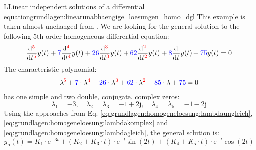 \begin{frame}
{    \begin{expl}{LLinear independent solutions of a differential equation}{grundlagen:linearunabhaengige_loesungen_homo_dgl}
        This example is taken almost unchanged from \cite[p. 241]{albach}.
        We are looking for the general solution to the following 5th order homogeneous differential equation:
        \begin{equation*}
            \dt[\ecr{5}] y(t) + \ecb{7} \dt[\ecr{4}] y(t) + \ecb{26} \dt[\ecr{3}] y(t) + \ecb{62} \dt[\ecr{2}] y(t) + \ecb{8} \dt y(t) + \ecb{75} y(t) = 0
        \end{equation*}
        The characteristic polynomial:
        \begin{equation*}
            \lambda^{\ecr{5}} + \ecb{7} \cdot \lambda^{\ecr{4}} + \ecb{26} \cdot \lambda^{\ecr{3}} + \ecb{62} \cdot \lambda^{\ecr{2}} + \ecb{85} \cdot \lambda + \ecb{75} = 0
        \end{equation*}
        has one simple and two double, conjugate, complex zeros:
        \begin{equation*}
            \lambda_1 = -3, \quad \lambda_2 = \lambda_3 = -1+\mathrm{2j}, \quad \lambda_4 = \lambda_5 = -1-\mathrm{2j}
        \end{equation*}
        Using the approaches from Eq. \ref{eq:grundlagen:homogeneloesung:lambdaungleich}, \ref{eq:grundlagen:homogeneloesung:lambdakomplex} and   
        \ref{eq:grundlagen:homogeneloesung:lambdagleich}, the general solution is:
        \begin{equation*}
            y_{\mathrm{h}}(t) = K_1 \cdot \mathrm{e}^{-3 t} + (K_2 + K_3 \cdot t) \cdot \mathrm{e}^{-t} \sin(2t) + (K_4 + K_5 \cdot t) \cdot \mathrm{e}^{-t} \cos(2t)
        \end{equation*}
    \end{expl}
}%
\end{frame}
